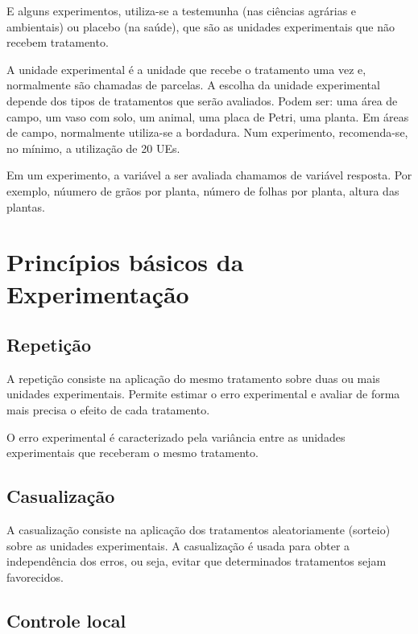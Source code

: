\documentclass[12pt,brazil,oneside]{book}
\begin{document}
E alguns experimentos, utiliza-se a testemunha (nas ciências agrárias e
ambientais) ou placebo (na saúde), que são as unidades experimentais que
não recebem tratamento.

A unidade experimental é a unidade que recebe o tratamento uma vez e,
normalmente são chamadas de parcelas. A escolha da unidade experimental
depende dos tipos de tratamentos que serão avaliados. Podem ser: uma
área de campo, um vaso com solo, um animal, uma placa de Petri, uma
planta. Em áreas de campo, normalmente utiliza-se a bordadura. Num
experimento, recomenda-se, no mínimo, a utilização de 20 UEs.

Em um experimento, a variável a ser avaliada chamamos de variável
resposta. Por exemplo, núumero de grãos por planta, número de folhas por
planta, altura das plantas.

\hypertarget{principios-basicos-da-experimentacao}{%
\section{Princípios básicos da
Experimentação}\label{principios-basicos-da-experimentacao}}

\hypertarget{repeticao}{%
\subsection{Repetição}\label{repeticao}}

A repetição consiste na aplicação do mesmo tratamento sobre duas ou mais
unidades experimentais. Permite estimar o erro experimental e avaliar de
forma mais precisa o efeito de cada tratamento.

O erro experimental é caracterizado pela variância entre as unidades
experimentais que receberam o mesmo tratamento.

\hypertarget{casualizacao}{%
\subsection{Casualização}\label{casualizacao}}

A casualização consiste na aplicação dos tratamentos aleatoriamente
(sorteio) sobre as unidades experimentais. A casualização é usada para
obter a independência dos erros, ou seja, evitar que determinados
tratamentos sejam favorecidos.

\hypertarget{controle-local}{%
\subsection{Controle local}\label{controle-local}}
\end{document}
